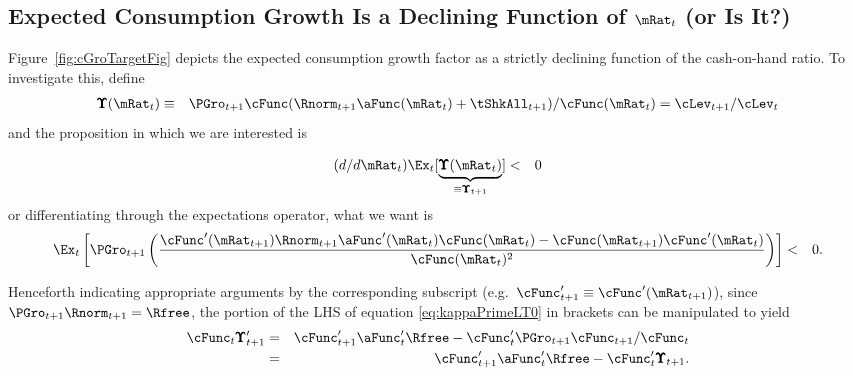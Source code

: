 \documentclass[titlepage]{\econtex}\providecommand{\texname}{BufferStockTheory}%
\begin{document}
{\subsection{Expected Consumption Growth Is a Declining Function of $\mRat_{t}$ (or Is It?)}
\label{subsec:dcgdxneg}

Figure~\ref{fig:cGroTargetFig} depicts the expected consumption growth factor as a strictly
declining function of the cash-on-hand ratio. To investigate this,
define
\begin{eqnarray*}
\pmb{\Upsilon}(\mRat_{t}) & \equiv & \PGro_{t+1} \cFunc(\Rnorm_{t+1}\aFunc(\mRat_{t})+\tShkAll_{t+1})/\cFunc(\mRat_{t})  = \cLev_{t+1}/\cLev_{t}
\end{eqnarray*}
and the proposition in which we are interested is

\begin{eqnarray}
  (d/d\mRat_{t})\Ex_{t}[\underbrace{\pmb{\Upsilon}(\mRat_{t})}_{\equiv \pmb{\Upsilon}_{t+1}}] & < & 0 \label{eq:dChi}  \nonumber
\end{eqnarray}
or differentiating through the expectations operator, what we want is
\begin{eqnarray}
\Ex_{t}\left[\PGro_{t+1} \left(\frac{\cFunc^{\prime}(\mRat_{t+1})\Rnorm_{t+1}\aFunc^{\prime}(\mRat_{t})\cFunc(\mRat_{t})-\cFunc(\mRat_{t+1})\cFunc^{\prime}(\mRat_{t})}{\cFunc(\mRat_{t})^{2}}\right)\right] & < & 0 \label{eq:kappaPrimeLT0}.
\end{eqnarray}

Henceforth indicating appropriate arguments by the corresponding
subscript (e.g.\ $\cFunc_{t+1}^{\prime} \equiv \cFunc^{\prime}(\mRat_{t+1})$), since
$\PGro_{t+1}\Rnorm_{t+1}=\Rfree$, the portion of the LHS of equation \eqref{eq:kappaPrimeLT0} in brackets can be manipulated to yield
\begin{eqnarray}
 \cFunc_{t} \pmb{\Upsilon}^{\prime}_{t+1} & = & \cFunc^{\prime}_{t+1}\aFunc^{\prime}_{t}\Rfree-\cFunc^{\prime}_{t} \PGro_{t+1} \cFunc_{t+1}/\cFunc_{t} \nonumber
\\ & = & \cFunc^{\prime}_{t+1}\aFunc^{\prime}_{t}\Rfree-\cFunc^{\prime}_{t} \pmb{\Upsilon}_{t+1} \label{eq:cPrimek}
.
\end{eqnarray}

}
\end{document}
